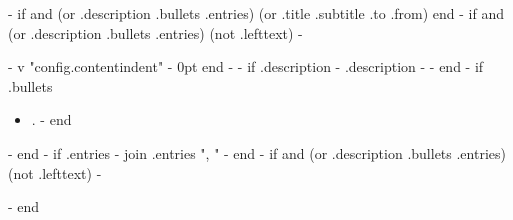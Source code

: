 {{- if and (or .description .bullets .entries) (or .title .subtitle .to .from) }}
	\vfill\break
{{ end -}}
{{ if and (or .description .bullets .entries) (not .lefttext) -}}
\begin{minipage}{\linewidth}
\begin{adjustwidth}{ {{- v "config.contentindent" -}} }{0pt}
{{ end -}}
{{- if .description -}}
	{{ .description -}}
{{- end -}}
{{ if .bullets }}
\begin{minipage}{\linewidth}
	\begin{itemize}
		{{- range .bullets }}
			\item {{ . -}}
		{{ end }}
	\end{itemize}
\end{minipage}
{{- end -}}
{{ if .entries -}}
	{{ join .entries ", " }}
{{- end -}}
{{ if and (or .description .bullets .entries) (not .lefttext) -}}
\end{adjustwidth}
\end{minipage}
{{- end }}